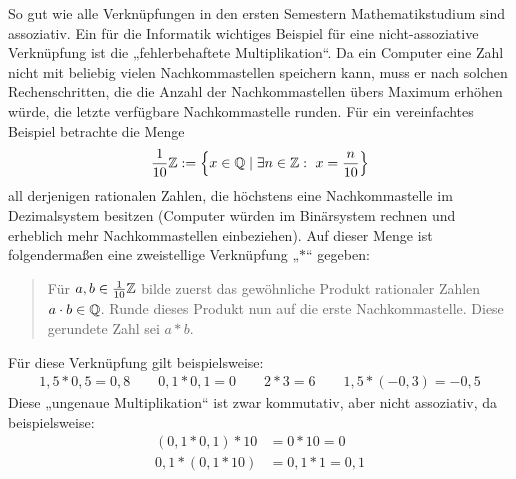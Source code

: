 \begin{bsp} \label{bsp:fehlerrech}
    So gut wie alle Verknüpfungen in den ersten Semestern Mathematikstudium sind assoziativ. Ein für die Informatik wichtiges Beispiel für eine nicht-assoziative Verknüpfung ist die „fehlerbehaftete Multiplikation“. Da ein Computer eine Zahl nicht mit beliebig vielen Nachkommastellen speichern kann, muss er nach solchen Rechenschritten, die die Anzahl der Nachkommastellen übers Maximum erhöhen würde, die letzte verfügbare Nachkommastelle runden. Für ein vereinfachtes Beispiel betrachte die Menge
        \[ \frac{1}{10}\mathbb Z := \left\{ x\in \mathbb Q \mid \exists n\in \mathbb Z:\ x=\frac{n}{10} \right\} \]
    all derjenigen rationalen Zahlen, die höchstens eine Nachkommastelle im Dezimalsystem besitzen (Computer würden im Binärsystem rechnen und erheblich mehr Nachkommastellen einbeziehen). Auf dieser Menge ist folgendermaßen eine zweistellige Verknüpfung „$*$“ gegeben:
    \begin{quote}
        Für $a,b\in \frac{1}{10}\mathbb Z$ bilde zuerst das gewöhnliche Produkt rationaler Zahlen $a\cdot b \in \mathbb Q$. Runde dieses Produkt nun auf die erste Nachkommastelle. Diese gerundete Zahl sei $a*b$.
    \end{quote}
    Für diese Verknüpfung gilt beispielsweise:
    \begin{align*}
        1{,}5* 0{,}5 = 0{,}8 \qquad 0{,}1* 0{,}1 = 0 \qquad 2*3 = 6 \qquad 1{,}5 * (-0{,}3)= -0{,}5 
    \end{align*}
    Diese „ungenaue Multiplikation“ ist zwar kommutativ, aber nicht assoziativ, da beispielsweise:
    \begin{align*}
        (0{,}1 * 0{,}1) * 10 & = 0*10 = 0 \\
        0{,}1*(0{,}1*10) & = 0{,}1*1 = 0{,}1
    \end{align*}
\end{bsp}


